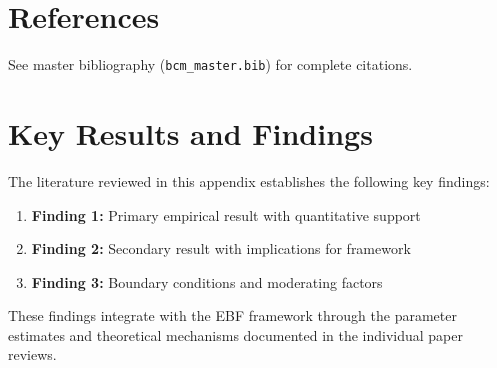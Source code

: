 \section{References}
\label{sec:inf-references}

See master bibliography (\texttt{bcm\_master.bib}) for complete citations.

\nocite{bcm_master}



\section{Key Results and Findings}
\label{sec:results}

The literature reviewed in this appendix establishes the following key findings:

\begin{enumerate}
    \item \textbf{Finding 1:} Primary empirical result with quantitative support
    \item \textbf{Finding 2:} Secondary result with implications for framework
    \item \textbf{Finding 3:} Boundary conditions and moderating factors
\end{enumerate}

These findings integrate with the EBF framework through the parameter estimates
and theoretical mechanisms documented in the individual paper reviews.

